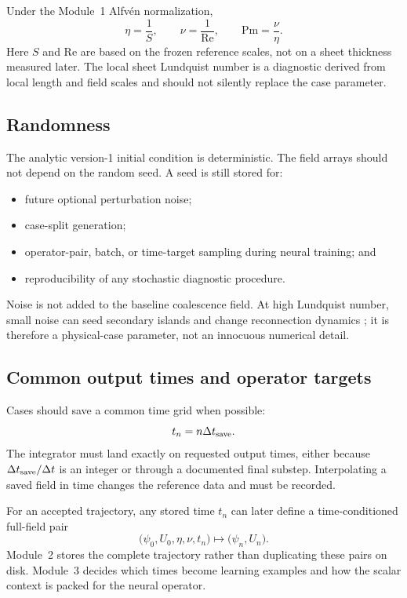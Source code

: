 \documentclass[11pt]{article}
\begin{document}
Under the Module~1 Alfv\'en normalization,
\begin{equation}
\eta=\frac{1}{S},
\qquad
\nu=\frac{1}{\mathrm{Re}},
\qquad
\mathrm{Pm}=\frac{\nu}{\eta}.
\end{equation}
Here $S$ and $\mathrm{Re}$ are based on the frozen reference scales, not on a sheet thickness measured later. The local sheet Lundquist number is a diagnostic derived from local length and field scales and should not silently replace the case parameter.

\subsection{Randomness}

The analytic version-1 initial condition is deterministic. The field arrays should not depend on the random seed. A seed is still stored for:
\begin{itemize}
  \item future optional perturbation noise;
  \item case-split generation;
  \item operator-pair, batch, or time-target sampling during neural training; and
  \item reproducibility of any stochastic diagnostic procedure.
\end{itemize}
Noise is not added to the baseline coalescence field. At high Lundquist number, small noise can seed secondary islands and change reconnection dynamics \cite{Ng2011}; it is therefore a physical-case parameter, not an innocuous numerical detail.

\subsection{Common output times and operator targets}

Cases should save a common time grid when possible:
\begin{equation}
t_n=n\Delta t_{\rm save}.
\end{equation}
The integrator must land exactly on requested output times, either because $\Delta t_{\rm save}/\Delta t$ is an integer or through a documented final substep. Interpolating a saved field in time changes the reference data and must be recorded.

For an accepted trajectory, any stored time $t_n$ can later define a time-conditioned full-field pair
\begin{equation}
\bigl(\psi_0,U_0,\eta,\nu,t_n\bigr)
\longmapsto
\bigl(\psi_n,U_n\bigr).
\label{eq:time_pair}
\end{equation}
Module~2 stores the complete trajectory rather than duplicating these pairs on disk. Module~3 decides which times become learning examples and how the scalar context is packed for the neural operator.
\end{document}
